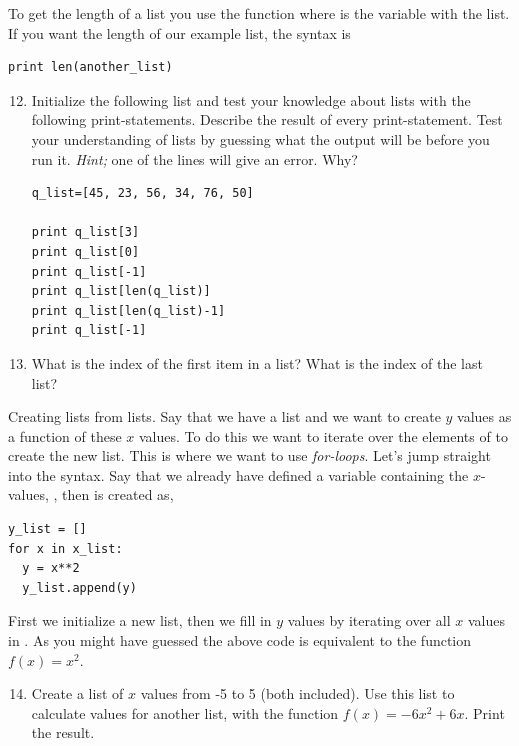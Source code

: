 \documentclass{article}
\begin{document}
To get the length of a list you use the function 
where  is the variable with the list.
If you want the length of our example list, the syntax is

\begin{lstlisting}
print len(another_list)
\end{lstlisting}


\begin{enumerate}
  \setcounter{enumi}{11}
  \item Initialize the following list and test your knowledge about
    lists with the following print-statements.
    Describe the result of every print-statement. Test your
    understanding of lists by guessing what the output will be before
    you run it. 
    {\em Hint;} one of the lines will give an error. Why?

\begin{lstlisting}
q_list=[45, 23, 56, 34, 76, 50]

print q_list[3]
print q_list[0]
print q_list[-1]
print q_list[len(q_list)]
print q_list[len(q_list)-1]
print q_list[-1]
\end{lstlisting}

  \item What is the index of the first item in a list? What is the index of
    the last list?

\end{enumerate}

Creating lists from lists. Say that we have a list 
and we want to create $y$ values as a function of these $x$ values.
To do this we want to iterate over the elements of  to create the new list.
This is where we want to use {\em for-loops}.
Let's jump straight into the syntax. Say that we already
have defined a variable containing the $x$-values, ,
then  is created as,

\begin{lstlisting}
y_list = []
for x in x_list:
  y = x**2
  y_list.append(y)
\end{lstlisting}

First we initialize a new list,
then we fill in $y$ values by iterating over
all $x$ values in .
As you might have guessed the above code is equivalent to 
the function $f(x) = x^2$.\\

\begin{enumerate}
  \setcounter{enumi}{13}
  \item Create a list of $x$ values from -5 to 5 (both included). Use this list
    to calculate values for another list, with the function $f(x) = -6x^2 + 6x$.
    Print the result.

\end{enumerate}
\end{document}
